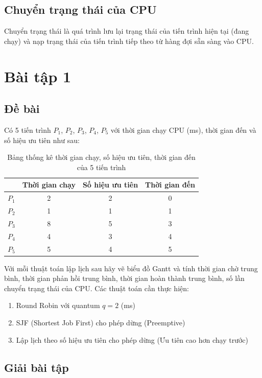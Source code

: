 \documentclass[12pt, letterpaper]{article}
\begin{document}
\subsection{Chuyển trạng thái của CPU}
Chuyển trạng thái là quá trình lưu lại trạng thái của tiến trình hiện tại (đang chạy) và nạp trạng thái của tiến trình tiếp theo từ hàng đợi sẵn sàng vào CPU.
\section{Bài tập 1}
\subsection{Đề bài}
Có 5 tiến trình $P_{1}$, $P_{2}$, $P_{3}$, $P_{4}$, $P_{5}$ với thời gian chạy CPU (ms), thời gian đến và số hiệu ưu tiên như sau:
\begin{table}[H]
    \centering
    \caption{Bảng thống kê thời gian chạy, số hiệu ưu tiên, thời gian đến của 5 tiến trình}
    \begin{tabular}{|c|c|c|c|}
        \hline
        & \textbf{Thời gian chạy} & \textbf{Số hiệu ưu tiên} & \textbf{Thời gian đến} \\
        \hline
        $P_{1}$ & 2 & 2 & 0 \\
        $P_{2}$ & 1 & 1 & 1 \\
        $P_{3}$ & 8 & 5 & 3 \\
        $P_{4}$ & 4 & 3 & 4 \\
        $P_{5}$ & 5 & 4 & 5 \\
        \hline
    \end{tabular}
\end{table}
\noindent Với mỗi thuật toán lập lịch sau hãy vẽ biểu đồ Gantt và tính thời gian chờ trung bình, thời gian
phản hồi trung bình, thời gian hoàn thành trung bình, số lần chuyển trạng thái của CPU.
\noindent Các thuật toán cần thực hiện:
\begin{enumerate}[label=\alph*.]
    \item Round Robin với quantum $q = 2$ (ms)
    \item SJF (Shortest Job First) cho phép dừng (Preemptive)
    \item Lập lịch theo số hiệu ưu tiên cho phép dừng (Ưu tiên cao hơn chạy trước)
\end{enumerate}
\subsection{Giải bài tập}
\end{document}
